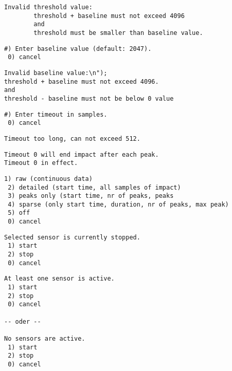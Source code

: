 \begin{lstlisting}[caption=Fehlermeldung ungültiger Threshold, label=list.paramthres]
		Invalid threshold value:
		threshold + baseline must not exceed 4096
		and
		threshold must be smaller than baseline value.
\end{lstlisting}

\begin{lstlisting}[caption=Untermenü Null-Level, label=list.parambase]
 #) Enter baseline value (default: 2047).
 0) cancel
\end{lstlisting}

\begin{lstlisting}[caption=Fehlermeldung ungültiger Null-Level, label=list.parambaseerror]
Invalid baseline value:\n");
threshold + baseline must not exceed 4096.
and
threshold - baseline must not be below 0 value
\end{lstlisting}

\begin{lstlisting}[caption=Untermenü Timeout, label=list.paramtimeout]
 #) Enter timeout in samples.
 0) cancel
\end{lstlisting}

\begin{lstlisting}[caption=Fehlermeldung zu langer Timeout, label=list.paramtimeoutlong]
Timeout too long, can not exceed 512.
\end{lstlisting}

\begin{lstlisting}[caption=Warnung kurzer Timeout, label=list.paramtimeoutshort]
Timeout 0 will end impact after each peak.
Timeout 0 in effect.
\end{lstlisting}

\begin{lstlisting}[caption=Untermenü Detail-Level, label=list.detail]
 1) raw (continuous data)
 2) detailed (start time, all samples of impact)
 3) peaks only (start time, nr of peaks, peaks
 4) sparse (only start time, duration, nr of peaks, max peak)
 5) off
 0) cancel
\end{lstlisting}

\begin{lstlisting}[caption=Untermenü Start/Stop einzeln, label=list.started_one]
Selected sensor is currently stopped.
 1) start
 2) stop
 0) cancel
\end{lstlisting}

\begin{lstlisting}[caption=Untermenü Start/Stop alle Sensoren, label=list.started_all]
At least one sensor is active.
 1) start
 2) stop
 0) cancel
 
-- oder --

No sensors are active.
 1) start
 2) stop
 0) cancel
\end{lstlisting}

